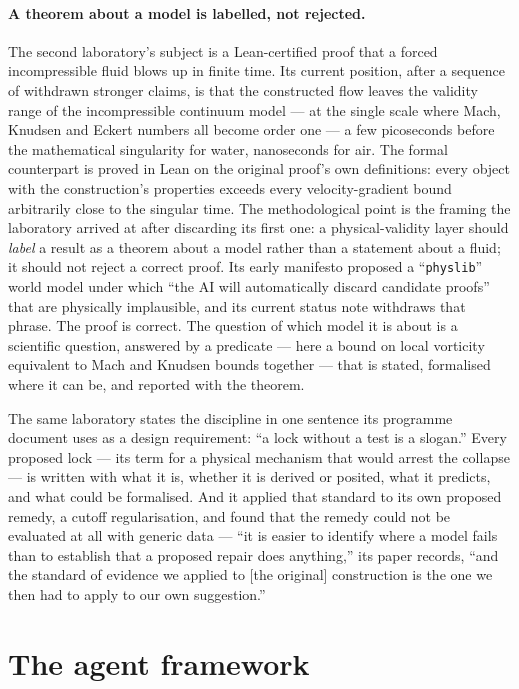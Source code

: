 \documentclass[11pt]{article}
\begin{document}
\paragraph{A theorem about a model is labelled, not rejected.} The second laboratory's subject
is a Lean-certified proof that a forced incompressible fluid blows up in finite time. Its
current position, after a sequence of withdrawn stronger claims, is that the constructed flow
leaves the validity range of the incompressible continuum model --- at the single scale where
Mach, Knudsen and Eckert numbers all become order one --- a few picoseconds before the
mathematical singularity for water, nanoseconds for air. The formal counterpart is proved in Lean on the original proof's own definitions:
every object with the construction's properties exceeds every velocity-gradient bound
arbitrarily close to the singular time. The methodological point is the framing the laboratory
arrived at after discarding its first one: a physical-validity layer should \emph{label} a
result as a theorem about a model rather than a statement about a fluid; it should not reject a
correct proof. Its early manifesto proposed a ``\texttt{physlib}'' world model under which
``the AI will automatically discard candidate proofs'' that are physically implausible, and
its current status note withdraws that phrase. The proof is correct. The question of which model it is about is a scientific question,
answered by a predicate --- here a bound on local vorticity equivalent to Mach and Knudsen
bounds together --- that is stated, formalised where it can be, and reported with the theorem.

The same laboratory states the discipline in one sentence its programme document uses as a
design requirement: ``a lock without a test is a slogan.'' Every proposed lock --- its term for
a physical mechanism that would arrest the collapse --- is written with what it is, whether it
is derived or posited, what it predicts, and what could be formalised. And it applied that standard to its own proposed remedy, a cutoff regularisation,
and found that the remedy could not be evaluated at all with generic data --- ``it is easier to
identify where a model fails than to establish that a proposed repair does anything,'' its paper
records, ``and the standard of evidence we applied to [the original] construction is the one we
then had to apply to our own suggestion.''

\section{The agent framework}
\label{sec:agents}
\end{document}
